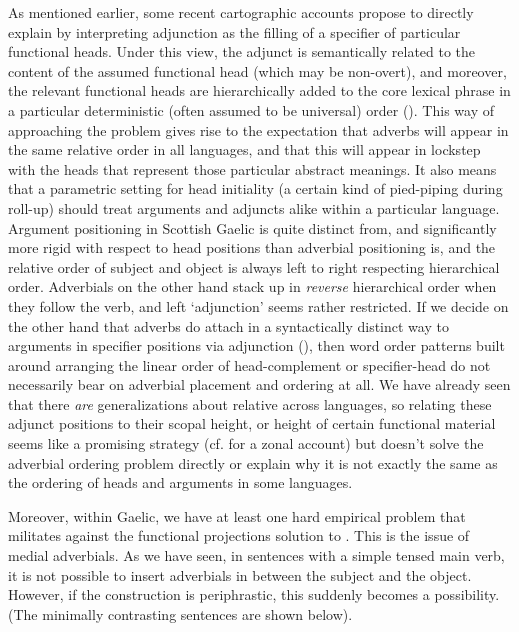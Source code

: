 \documentclass[output=paper,colorlinks,citecolor=brown]{langscibook}
\begin{document}
As mentioned earlier,  some recent cartographic accounts propose to directly explain  by interpreting adjunction as the filling of a specifier of particular functional heads. Under this view, the adjunct is semantically related to the content of the assumed functional head (which may be non-overt), and moreover, the relevant functional heads are hierarchically added to the core lexical phrase in a particular deterministic (often assumed to be universal) order (\citealt{cinque99}). This way of approaching the problem gives rise to the expectation that adverbs will appear in the same relative order in all languages, and that this will appear in lockstep with the heads that represent those particular abstract meanings. It also means that a parametric setting for head initiality (a certain kind of pied-piping during roll-up) should treat arguments and adjuncts alike within a particular language. Argument positioning in Scottish Gaelic is quite distinct from, and significantly more rigid with respect to head positions than adverbial positioning is, and the relative order of subject and object is always left to right respecting hierarchical order. Adverbials on the other hand stack up in \textit{reverse} hierarchical order when they follow the verb, and left `adjunction' seems rather restricted.   If we decide on the other hand that adverbs do attach in a syntactically distinct way to arguments in specifier positions via adjunction (\citealt{roberts96, kayne94as}), then word order patterns built around arranging the linear order of head-complement or specifier-head do not necessarily bear on adverbial placement and ordering at all. We have already seen that there \textit{are} generalizations about relative  across languages, so relating these adjunct positions to their scopal height, or height of certain functional material seems like a promising strategy (cf. \citealt{ramchandsvenonius14} for a zonal account) but doesn't solve the adverbial ordering problem directly or explain why it is not exactly the same as the ordering of heads and arguments in some languages.  

Moreover, within  Gaelic, we have at least one hard empirical problem that militates against the functional projections solution to . This is the issue of medial adverbials. As we have seen, in sentences with a simple tensed main verb, it is not possible to insert adverbials in between the subject and the object. However, if the construction is periphrastic, this suddenly becomes a possibility. (The minimally contrasting sentences are shown below). 
\end{document}
